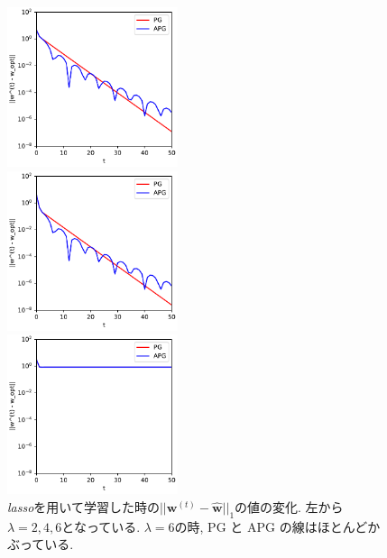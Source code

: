 \documentclass[a4paper,10pt]{jsarticle}
\begin{document}
\begin{figure}[htbp]
 \begin{minipage}{0.33\hsize}
  \begin{center}
   \includegraphics[width=5cm]{figs/p2_lasso_dist_lambda-2.pdf}
  \end{center}
 \end{minipage}
 \begin{minipage}{0.33\hsize}
  \begin{center}
   \includegraphics[width=5cm]{figs/p2_lasso_dist_lambda-4.pdf}
  \end{center}
 \end{minipage}
 \begin{minipage}{0.33\hsize}
  \begin{center}
   \includegraphics[width=5cm]{figs/p2_lasso_dist_lambda-6.pdf}
  \end{center}
 \end{minipage}
 \caption{\textit{lasso}を用いて学習した時の$||\bm{w}^{(t)} - \hat{\bm{w}}||_1$の値の変化.
 左から $\lambda=2, 4, 6$となっている.
 $\lambda=6$の時, PG と APG の線はほとんどかぶっている.}
 \label{img:lasso-error}
\end{figure}
\end{document}
